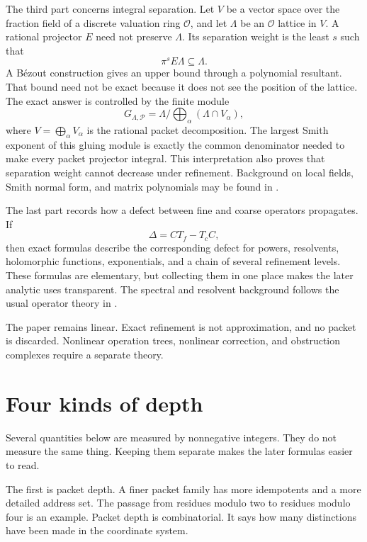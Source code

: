 \documentclass[11pt,a4paper]{article}
\theoremstyle{definition}
\theoremstyle{remark}
\newcommand{\OO}{\mathcal O}
\newcommand{\Pcal}{\mathcal P}
\providecommand{\OO}{\mathcal O}
\theoremstyle{definition}\newtheorem{construction}[theorem]{Construction}\newtheorem{certificate}[theorem]{Numerical Certificate}
\theoremstyle{remark}\newtheorem{boundary}[theorem]{Boundary}
\begin{document}
The third part concerns integral separation.  Let $V$ be a vector space over the fraction field of a discrete valuation ring $\OO$, and let $\Lambda$ be an $\OO$ lattice in $V$.  A rational projector $E$ need not preserve $\Lambda$.  Its separation weight is the least $s$ such that
\[
\pi^sE\Lambda\subseteq\Lambda.
\]
A Bézout construction gives an upper bound through a polynomial resultant.  That bound need not be exact because it does not see the position of the lattice.  The exact answer is controlled by the finite module
\[
G_{\Lambda,\Pcal}
=
\Lambda\Big/\bigoplus_{\alpha}(\Lambda\cap V_\alpha),
\]
where $V=\bigoplus_\alpha V_\alpha$ is the rational packet decomposition.  The largest Smith exponent of this gluing module is exactly the common denominator needed to make every packet projector integral.  This interpretation also proves that separation weight cannot decrease under refinement.  Background on local fields, Smith normal form, and matrix polynomials may be found in \cite{Serre1979,Newman1972,GohbergLancasterRodman2009}.

The last part records how a defect between fine and coarse operators propagates.  If
\[
\Delta=CT_f-T_cC,
\]
then exact formulas describe the corresponding defect for powers, resolvents, holomorphic functions, exponentials, and a chain of several refinement levels.  These formulas are elementary, but collecting them in one place makes the later analytic uses transparent.  The spectral and resolvent background follows the usual operator theory in \cite{Kato1995}.

The paper remains linear.  Exact refinement is not approximation, and no packet is discarded.  Nonlinear operation trees, nonlinear correction, and obstruction complexes require a separate theory.

\section{Four kinds of depth}\label{sec:four_depths}

Several quantities below are measured by nonnegative integers.  They do not measure the same thing.  Keeping them separate makes the later formulas easier to read.

The first is packet depth.  A finer packet family has more idempotents and a more detailed address set.  The passage from residues modulo two to residues modulo four is an example.  Packet depth is combinatorial.  It says how many distinctions have been made in the coordinate system.
\end{document}
